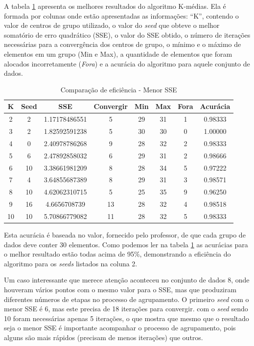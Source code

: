 \documentclass[12pt, a4paper]{article}
\begin{document}
A tabela \ref{tabMelhor} apresenta os melhores resultados do algoritmo K-médias. Ela é formada por colunas onde estão apresentadas as informações: ``K'', contendo o valor de centros de grupo utilizado, o valor do \emph{seed} que obteve o melhor somatório de erro quadrático (SSE), o valor do SSE obtido, o número de iterações necessárias para a convergência dos centros de grupo, o mínimo e o máximo de elementos em um grupo (Min e Max), a quantidade de elementos que foram alocados incorretamente (\emph{Fora}) e a acurácia do algoritmo para aquele conjunto de dados.
\begin{table}[!ht]
	\centering
	\caption{Comparação de eficiência - Menor SSE}	
	\label{tabMelhor}
	\begin{tabular}{|c|c|c|c|c|c|c|c|}
	\hline
	K & Seed & SSE & Convergir & Min & Max & Fora & Acurácia\\
	\hline
	2 & 2 & 1.17178486551 & 5 & 29 & 31 & 1 & 0.98333 \\
	\hline
	3 & 2 & 1.82592591238 & 5 & 30 & 30 & 0 & 1.00000 \\
	\hline
	4 & 0 & 2.40978786268 & 9 & 28 & 32 & 2 & 0.98333\\
	\hline
	5 & 6 & 2.47892858032 & 6 & 29 & 31 & 2 & 0.98666\\
	\hline
	6 & 10 & 3.38661981209 & 8 & 28 & 34 & 5 & 0.97222\\
	\hline
	7 & 4 & 3.64855687389 & 8 & 29 & 31 & 3 & 0.98571\\
	\hline
	8 & 10 & 4.62062310715 & 5 & 25 & 35 & 9 & 0.96250\\ %
	\hline
	9 & 16 & 4.6656708739 & 13 & 28 & 32 & 4 & 0.98518\\
	\hline
	10 & 10 & 5.70866779082 & 11 & 28 & 32 & 5 & 0.98333\\
	\hline
	\end{tabular}
\end{table}
Esta acurácia é baseada no valor, fornecido pelo professor, de que cada grupo de dados deve conter 30 elementos. Como podemos ler na tabela \ref{tabMelhor} as acurácias para o melhor resultado estão todas acima de 95\%, demonstrando a eficiência do algoritmo para os \emph{seeds} listados na coluna 2.

Um caso interessante que merece atenção aconteceu no conjunto de dados 8, onde houveram vários pontos com o mesmo valor para o SSE, mas que produziram diferentes números de etapas no processo de agrupamento. O primeiro \emph{seed} com o menor SSE é 6, mas este precisa de 18 iterações para convergir. com o \emph{seed} sendo 10 foram necessárias apenas 5 iterações, o que mostra que mesmo que o resultado seja o menor SSE é importante acompanhar o processo de agrupamento, pois alguns são mais rápidos (precisam de menos iterações) que outros.
\end{document}
